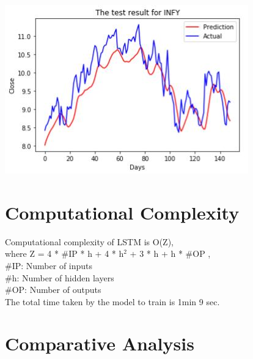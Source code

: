 				\begin{center}
				\includegraphics[width=\linewidth]{figures/test-data-results.jpg}	
				\label{fig: Plot showing of Actual and Predicted values}
				\end{center}

\section{Computational Complexity}

Computational complexity of LSTM is O(Z),\\
  where Z = 4 * \#IP * h + 4 * h$^{2}$ + 3 * h + h * \#OP , \\
 \tab\#IP: Number of inputs\\
 \tab\#h: Number of hidden layers\\
 \tab\#OP: Number of outputs\\

The total time taken by the model to train is 1min 9 sec.
\section{Comparative Analysis} 

